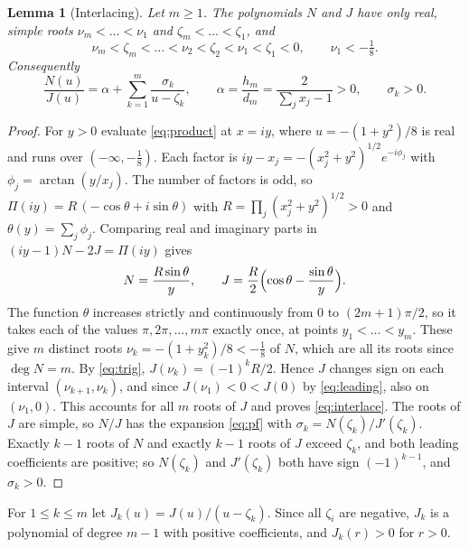 \documentclass[11pt]{article}
\theoremstyle{plain}
\newtheorem{lemma}[theorem]{Lemma}
\theoremstyle{definition}
\theoremstyle{remark}
\numberwithin{equation}{section}
\begin{document}
\begin{lemma}[Interlacing]\label{lem:interlace}
Let \(m\ge1\). The polynomials \(N\) and \(J\) have only real, simple roots
\(\nu_m<\dots<\nu_1\) and \(\zeta_m<\dots<\zeta_1\), and
\begin{equation}\label{eq:interlace}
 \nu_m<\zeta_m<\dots<\nu_2<\zeta_2<\nu_1<\zeta_1<0 ,\qquad \nu_1<-\tfrac18 .
\end{equation}
Consequently
\begin{equation}\label{eq:pf}
 \frac{N(u)}{J(u)}=\alpha+\sum_{k=1}^m\frac{\sigma_k}{u-\zeta_k},\qquad
 \alpha=\frac{h_m}{d_m}=\frac{2}{\sum_jx_j-1}>0,\qquad \sigma_k>0 .
\end{equation}
\end{lemma}
\begin{proof}
For \(y>0\) evaluate \eqref{eq:product} at \(x=iy\), where \(u=-(1+y^2)/8\) is real and runs
over \((-\infty,-\tfrac18)\). Each factor is \(iy-x_j=-(x_j^2+y^2)^{1/2}e^{-i\phi_j}\) with
\(\phi_j=\arctan(y/x_j)\). The number of factors is odd, so
\(\Pi(iy)=R\,(-\cos\theta+i\sin\theta)\) with \(R=\prod_j(x_j^2+y^2)^{1/2}>0\) and
\(\theta(y)=\sum_j\phi_j\). Comparing real and imaginary parts in
\((iy-1)N-2J=\Pi(iy)\) gives
\begin{equation}\label{eq:trig}
 N=\frac{R\sin\theta}{y},\qquad J=\frac{R}{2}\Bigl(\cos\theta-\frac{\sin\theta}{y}\Bigr).
\end{equation}
The function \(\theta\) increases strictly and continuously from \(0\) to \((2m+1)\pi/2\), so
it takes each of the values \(\pi,2\pi,\dots,m\pi\) exactly once, at points
\(y_1<\dots<y_m\). These give \(m\) distinct roots \(\nu_k=-(1+y_k^2)/8<-\tfrac18\) of \(N\),
which are all its roots since \(\deg N=m\). By \eqref{eq:trig}, \(J(\nu_k)=(-1)^kR/2\). Hence
\(J\) changes sign on each interval \((\nu_{k+1},\nu_k)\), and since \(J(\nu_1)<0<J(0)\) by
\eqref{eq:leading}, also on \((\nu_1,0)\). This accounts for all \(m\) roots of \(J\) and
proves \eqref{eq:interlace}. The roots of \(J\) are simple, so \(N/J\) has the expansion
\eqref{eq:pf} with \(\sigma_k=N(\zeta_k)/J'(\zeta_k)\). Exactly \(k-1\) roots of \(N\) and
exactly \(k-1\) roots of \(J\) exceed \(\zeta_k\), and both leading coefficients are positive;
so \(N(\zeta_k)\) and \(J'(\zeta_k)\) both have sign \((-1)^{k-1}\), and \(\sigma_k>0\).
\end{proof}

For \(1\le k\le m\) let \(J_k(u)=J(u)/(u-\zeta_k)\). Since all \(\zeta_i\) are negative, \(J_k\)
is a polynomial of degree \(m-1\) with positive coefficients, and \(J_k(r)>0\) for \(r>0\).
\end{document}
